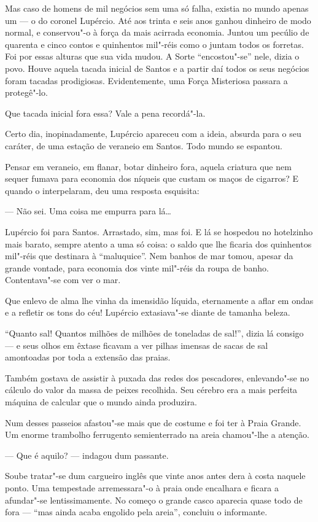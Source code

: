 Mas caso de homens de mil negócios sem uma só falha, existia no mundo
apenas um --- o do coronel Lupércio. Até aos trinta e seis anos ganhou
dinheiro de modo normal, e conservou"-o à força da mais acirrada
economia. Juntou um pecúlio de quarenta e cinco contos e quinhentos
mil"-réis como o juntam todos os forretas. Foi por essas alturas que sua
vida mudou. A Sorte ``encostou"-se'' nele, dizia o povo. Houve aquela
tacada inicial de Santos e a partir daí todos os seus negócios foram
tacadas prodigiosas. Evidentemente, uma Força Misteriosa passara a
protegê"-lo.

Que tacada inicial fora essa? Vale a pena recordá"-la.

Certo dia, inopinadamente, Lupércio apareceu com a ideia, absurda para o
seu caráter, de uma estação de veraneio em Santos. Todo mundo se
espantou.

Pensar em veraneio, em flanar, botar dinheiro fora, aquela criatura que
nem sequer fumava para economia dos níqueis que custam os maços de
cigarros? E quando o interpelaram, deu uma resposta esquisita:

--- Não sei. Uma coisa me empurra para lá\ldots{}

Lupércio foi para Santos. Arrastado, sim, mas foi. E lá se hospedou no
hotelzinho mais barato, sempre atento a uma só coisa: o saldo que lhe
ficaria dos quinhentos mil"-réis que destinara à ``maluquice''. Nem
banhos de mar tomou, apesar da grande vontade, para economia dos vinte
mil"-réis da roupa de banho. Contentava"-se com ver o mar.

Que enlevo de alma lhe vinha da imensidão líquida, eternamente a aflar
em ondas e a refletir os tons do céu! Lupércio extasiava"-se diante de
tamanha beleza.

``Quanto sal! Quantos milhões de milhões de toneladas de sal!'', dizia
lá consigo --- e seus olhos em êxtase ficavam a ver pilhas imensas de
sacas de sal amontoadas por toda a extensão das praias.

Também gostava de assistir à puxada das redes dos pescadores,
enlevando"-se no cálculo do valor da massa de peixes recolhida. Seu
cérebro era a mais perfeita máquina de calcular que o mundo ainda
produzira.

Num desses passeios afastou"-se mais que de costume e foi ter à Praia
Grande. Um enorme trambolho ferrugento semienterrado na areia chamou"-lhe
a atenção.

--- Que é aquilo? --- indagou dum passante.

Soube tratar"-se dum cargueiro inglês que vinte anos antes dera à costa
naquele ponto. Uma tempestade arremessara"-o à praia onde encalhara e
ficara a afundar"-se lentissimamente. No começo o grande casco aparecia
quase todo de fora --- ``mas ainda acaba engolido pela areia'', concluiu
o informante.

